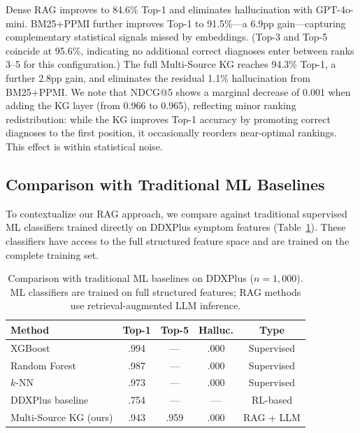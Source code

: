 \documentclass[runningheads]{llncs}
\begin{document}
Dense RAG improves to 84.6\% Top-1 and eliminates hallucination with GPT-4o-mini. BM25+PPMI further improves Top-1 to 91.5\%---a 6.9pp gain---capturing complementary statistical signals missed by embeddings. (Top-3 and Top-5 coincide at 95.6\%, indicating no additional correct diagnoses enter between ranks 3--5 for this configuration.) The full Multi-Source KG reaches 94.3\% Top-1, a further 2.8pp gain, and eliminates the residual 1.1\% hallucination from BM25+PPMI. We note that NDCG@5 shows a marginal decrease of 0.001 when adding the KG layer (from 0.966 to 0.965), reflecting minor ranking redistribution: while the KG improves Top-1 accuracy by promoting correct diagnoses to the first position, it occasionally reorders near-optimal rankings. This effect is within statistical noise.

\subsection{Comparison with Traditional ML Baselines}
\label{sec:ml_baselines}

To contextualize our RAG approach, we compare against traditional supervised ML classifiers trained directly on DDXPlus symptom features (Table~\ref{tab:ml_baselines}). These classifiers have access to the full structured feature space and are trained on the complete training set.

\begin{table}[t]
\centering
\caption{Comparison with traditional ML baselines on DDXPlus ($n{=}1{,}000$). ML classifiers are trained on full structured features; RAG methods use retrieval-augmented LLM inference.}
\label{tab:ml_baselines}
\begin{tabular}{lcccc}
\toprule
\textbf{Method} & \textbf{Top-1} & \textbf{Top-5} & \textbf{Halluc.} & \textbf{Type} \\
\midrule
XGBoost         & .994 & --- & .000 & Supervised \\
Random Forest   & .987 & --- & .000 & Supervised \\
$k$-NN          & .973 & --- & .000 & Supervised \\
DDXPlus baseline~\cite{fansi2022ddxplus} & .754 & --- & --- & RL-based \\
\midrule
Multi-Source KG (ours) & .943 & .959 & .000 & RAG + LLM \\
\bottomrule
\end{tabular}
\end{table}
\end{document}
